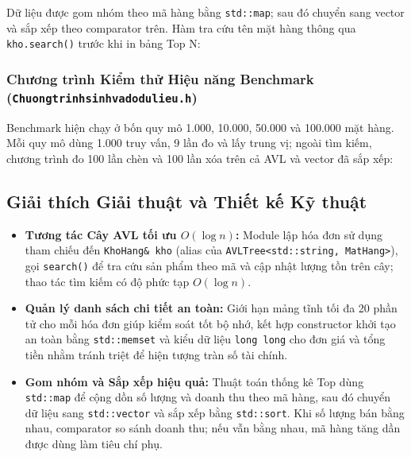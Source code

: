 Dữ liệu được gom nhóm theo mã hàng bằng \texttt{std::map}; sau đó chuyển sang vector và sắp xếp theo comparator trên. Hàm tra cứu tên mặt hàng thông qua \texttt{kho.search()} trước khi in bảng Top N:


\subsubsection{Chương trình Kiểm thử Hiệu năng Benchmark (\texttt{Chuongtrinhsinhvadodulieu.h})}
Benchmark hiện chạy ở bốn quy mô 1.000, 10.000, 50.000 và 100.000 mặt hàng. Mỗi quy mô dùng 1.000 truy vấn, 9 lần đo và lấy trung vị; ngoài tìm kiếm, chương trình đo 100 lần chèn và 100 lần xóa trên cả AVL và vector đã sắp xếp:


\subsection{Giải thích Giải thuật và Thiết kế Kỹ thuật}
\begin{itemize}
    \item \textbf{Tương tác Cây AVL tối ưu $O(\log n)$:} Module lập hóa đơn sử dụng tham chiếu đến \texttt{KhoHang\& kho} (alias của \texttt{AVLTree<std::string, MatHang>}), gọi \texttt{search()} để tra cứu sản phẩm theo mã và cập nhật lượng tồn trên cây; thao tác tìm kiếm có độ phức tạp $O(\log n)$.
    \item \textbf{Quản lý danh sách chi tiết an toàn:} Giới hạn mảng tĩnh tối đa 20 phần tử cho mỗi hóa đơn giúp kiểm soát tốt bộ nhớ, kết hợp constructor khởi tạo an toàn bằng \texttt{std::memset} và kiểu dữ liệu \texttt{long long} cho đơn giá và tổng tiền nhằm tránh triệt để hiện tượng tràn số tài chính.
    \item \textbf{Gom nhóm và Sắp xếp hiệu quả:} Thuật toán thống kê Top dùng \texttt{std::map} để cộng dồn số lượng và doanh thu theo mã hàng, sau đó chuyển dữ liệu sang \texttt{std::vector} và sắp xếp bằng \texttt{std::sort}. Khi số lượng bán bằng nhau, comparator so sánh doanh thu; nếu vẫn bằng nhau, mã hàng tăng dần được dùng làm tiêu chí phụ.
\end{itemize}
